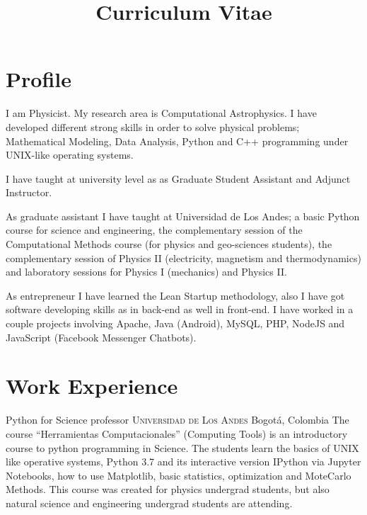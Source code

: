 \documentclass[12pt,letterpaper,sans]{moderncv}
\title{Curriculum Vitae}
\newcommand{\forceindent}{\leavevmode{\parindent=1em\indent}}
\begin{document}

\makecvtitle %


\section{Profile}

I am Physicist. My research area is Computational Astrophysics. I have developed different 
strong skills in order to solve physical problems; Mathematical Modeling, Data Analysis, 
Python and C++ programming under UNIX-like operating systems. 
\par
\forceindent I have taught at university level as as Graduate Student 
Assistant and Adjunct Instructor.

As graduate assistant I have taught at Universidad de Los Andes; a basic Python course for
science and engineering, the complementary session of the Computational Methods course (for
physics and geo-sciences students), the complementary session of Physics II (electricity,
magnetism and thermodynamics) and laboratory sessions for Physics I (mechanics) and Physics II. 

\forceindent As entrepreneur I have learned the
Lean Startup methodology, also I have got software developing skills as in back-end as 
well in front-end. I have worked in a couple projects involving Apache, Java (Android),
MySQL, PHP, NodeJS and JavaScript (Facebook Messenger Chatbots).
\par


\section{Work Experience}

        {Python for Science professor}
        {\textsc{Universidad de Los Andes}}
        {Bogotá, Colombia}{}
        {The course ``Herramientas Computacionales'' (Computing Tools) is an introductory course
          to python programming in Science. The students learn the basics of UNIX like operative
          systems, Python 3.7 and its interactive version IPython via Jupyter Notebooks, how to
          use Matplotlib, basic statistics, optimization and MoteCarlo Methods. This course was
          created for physics undergrad students, but also natural science and engineering
          undergrad students are attending.}
\end{document}

